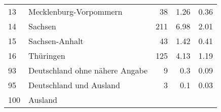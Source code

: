\begin{longtable}{lXrrr}
     13 &
     \multicolumn{1}{X}{ Mecklenburg-Vorpommern   } &


       \num{38} &
       \num[round-mode=places,round-precision=2]{1.26} &
         \num[round-mode=places,round-precision=2]{0.36} \\

     14 &
     \multicolumn{1}{X}{ Sachsen   } &


       \num{211} &
       \num[round-mode=places,round-precision=2]{6.98} &
         \num[round-mode=places,round-precision=2]{2.01} \\

     15 &
     \multicolumn{1}{X}{ Sachsen-Anhalt   } &


       \num{43} &
       \num[round-mode=places,round-precision=2]{1.42} &
         \num[round-mode=places,round-precision=2]{0.41} \\

     16 &
     \multicolumn{1}{X}{ Thüringen   } &


       \num{125} &
       \num[round-mode=places,round-precision=2]{4.13} &
         \num[round-mode=places,round-precision=2]{1.19} \\

     93 &
     \multicolumn{1}{X}{ Deutschland ohne nähere Angabe   } &


       \num{9} &
       \num[round-mode=places,round-precision=2]{0.3} &
         \num[round-mode=places,round-precision=2]{0.09} \\

     95 &
     \multicolumn{1}{X}{ Deutschland und Ausland   } &


       \num{3} &
       \num[round-mode=places,round-precision=2]{0.1} &
         \num[round-mode=places,round-precision=2]{0.03} \\

     100 &
     \multicolumn{1}{X}{ Ausland   } &



\end{longtable}
